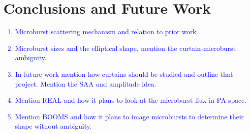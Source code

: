 \chapter{Conclusions and Future Work}\label{conclusions}
\textcolor{blue}{
\begin{enumerate}
\item Microburst scattering mechanism and relation to prior work
\item Microburst sizes and the elliptical shape, mention the curtain-microburst ambiguity.
\item In future work mention how curtains should be studied and outline that project. Mention the SAA and amplitude idea.
\item Mention REAL and how it plans to look at the microburst flux in PA space.
\item Mention BOOMS and how it plans to image microbursts to determine their shape without ambiguity.
\end{enumerate}
}